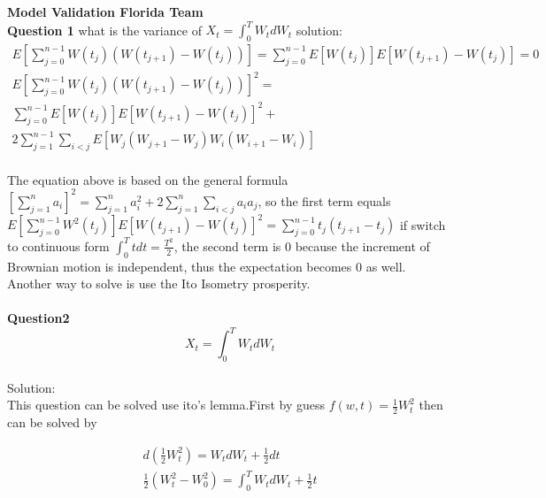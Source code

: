 \documentclass[a4paper,11pt]{article}
\begin{document}
{\bf Model Validation Florida Team}\\
{\bf Question 1}
what is the variance of $X_t=\int_0^T W_t dW_t$
solution:
\begin{equation}
\begin{aligned}
E[\sum\limits_{j=0}^{n-1} W(t_j)(W(t_{j+1})-W(t_j))] = \sum\limits_{j=0}^{n-1} E[W(t_j)]E[W(t_{j+1})-W(t_j)]=0\\
E[\sum\limits_{j=0}^{n-1}W(t_j)(W(t_{j+1})-W(t_j))]^2=\\
\sum\limits_{j=0}^{n-1}E[W(t_j)]E[W(t_{j+1})-W(t_j)]^2+\\
2\sum\limits_{j=1}^{n-1}\sum\limits_{i<j} E[W_j(W_{j+1}-W_j)W_i(W_{i+1}-W_i)]
\end{aligned}
\end{equation}\\
The equation above is based on the general formula $[\sum\limits_{j=1}^{n} a_i]^2=\sum\limits_{j=1}^{n} a_i^2+2\sum\limits_{j=1}^{n}\sum\limits_{i<j}a_i a_j$, so the first term equals $E[\sum\limits_{j=0}^{n-1}W^2(t_j)]E[W(t_{j+1})-W(t_j)]^2=\sum\limits_{j=0}^{n-1}t_j(t_{j+1}-t_j)$ if switch to continuous form $\int_0^T tdt=\frac{T^2}{2}$, the second term is 0 because the increment of Brownian motion is
independent, thus the expectation becomes 0 as well. Another way to solve is use the Ito Isometry prosperity.\\ \\
{\bf Question2}
\begin{equation}
X_t=\int_0^T W_t dW_t
\end{equation}\\
Solution:\\
This question can be solved use ito's lemma.First by guess $f(w,t)=\frac{1}{2} W_t^2$ then can be solved by

\begin{equation}
\begin{aligned}
d(\frac{1}{2}W_t^2)=W_t dW_t+\frac{1}{2}dt\\
\frac{1}{2}(W_t^2-W_0^2)=\int_0^T W_t dW_t+\frac{1}{2}t
\end{aligned}
\end{equation}
\end{document}
